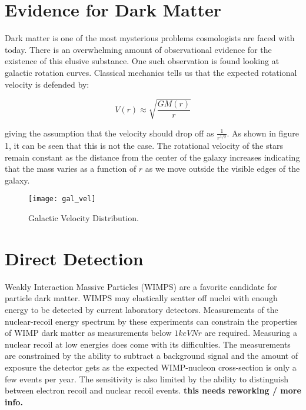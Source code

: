 \section{Evidence for Dark Matter}

Dark matter is one of the most mysterious problems cosmologists are faced with today. There is an overwhelming amount of observational evidence for the existence of this elusive substance. One such observation is found looking at galactic rotation curves. Classical mechanics tells us that the expected rotational velocity is defended by:

\begin{equation}
	V(r) \approx \sqrt{\frac{GM(r)}{r}}
\end{equation}

\noindent
giving the assumption that the velocity should drop off as $\frac{1}{r^{1/2}}$. As shown in figure 1, it can be seen that this is not the case. The rotational velocity of the stars remain constant as the distance from the center of the galaxy increases indicating that the mass varies as a function of $r$ as we move outside the visible edges of the galaxy.\cite{phipps_ionization_2016}

\begin{figure}[h]
	\centering
	\texttt{[image: gal\_vel]}
	\caption{Galactic Velocity Distribution.\cite{phipps_ionization_2016}}
\end{figure}

\newpage
\section{Direct Detection}
Weakly Interaction Massive Particles (WIMPS) are a favorite candidate for particle dark matter. WIMPS may elastically scatter off nuclei with enough energy to be detected by current laboratory detectors. Measurements of the nuclear-recoil energy spectrum by these experiments can constrain the properties of WIMP dark matter as measurements below $1keVNr$ are required.\cite{agnese_cdmslite:_2014} Measuring a nuclear recoil at low energies does come with its difficulties. The measurements are constrained by the ability to subtract a background signal and the amount of exposure the detector gets as the expected WIMP-nucleon cross-section is only a few events per year. \cite{sorensen_atomic_2015} The sensitivity is also limited by the ability to distinguish between electron recoil and nuclear recoil events. \textbf{this needs reworking / more info.}


